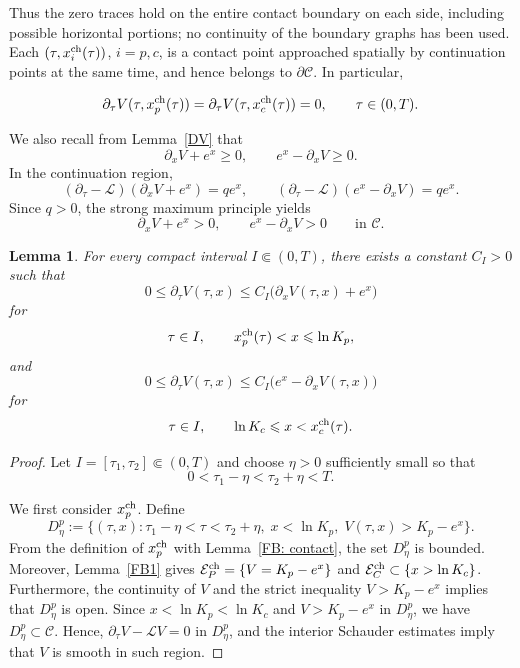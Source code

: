 \documentclass[11pt, a4paper, leqno]{amsart}
\numberwithin{equation}{section}
\theoremstyle{plain}
\newtheorem{lemma}[theorem]{Lemma}
\theoremstyle{definition}
\theoremstyle{remark}
\def\leq{\leqslant}
\def\geq{\geqslant}
\begin{document}
{Thus the zero traces hold on the entire contact boundary on each side,
including possible horizontal portions; no continuity of the boundary
graphs has been used. Each $(\tau,x_i^{\rm ch}(\tau))$, $i=p,c$,
is a contact point approached spatially by continuation points at the
same time, and hence belongs to $\partial\mathcal C$. In particular,

\begin{equation}\label{Vtau boundary}
    \partial_\tau V(\tau,x_p^{\rm ch}(\tau))
    =
    \partial_\tau V(\tau,x_c^{\rm ch}(\tau))
    =0,
    \qquad \tau\in(0,T).
\end{equation}

We also recall from Lemma~\ref{DV} that
\[
    \partial_xV+e^x\geq0,
    \qquad
    e^x-\partial_xV\geq0.
\]
In the continuation region,
\[
    (\partial_\tau-\mathcal L)(\partial_xV+e^x)
    =qe^x,
    \qquad
    (\partial_\tau-\mathcal L)(e^x-\partial_xV)
    =qe^x.
\]
Since $q>0$, the strong maximum principle yields
\begin{equation}\label{strict spatial derivative}
    \partial_xV+e^x>0,
    \qquad
    e^x-\partial_xV>0
    \qquad\text{in }\mathcal C.
\end{equation}

\begin{lemma}\label{derivative estimate FB}
For every compact interval $I\Subset(0,T)$, there exists a constant
$C_I>0$ such that
\begin{equation}\label{put derivative estimate}
    0\leq\partial_\tau V(\tau,x)
    \leq
    C_I\bigl(\partial_xV(\tau,x)+e^x\bigr)
\end{equation}
for
\[
    \tau\in I,
    \qquad
    x_p^{\rm ch}(\tau)<x\leq\ln K_p,
\]
and
\begin{equation}\label{call derivative estimate}
    0\leq\partial_\tau V(\tau,x)
    \leq
    C_I\bigl(e^x-\partial_xV(\tau,x)\bigr)
\end{equation}
for
\[
    \tau\in I,
    \qquad
    \ln K_c\leq x<x_c^{\rm ch}(\tau).
\]
\end{lemma}

\begin{proof}
Let $I=[\tau_1,\tau_2]\Subset(0,T)$ and choose $\eta>0$ sufficiently
small so that
\[
    0<\tau_1-\eta<\tau_2+\eta<T.
\]

We first consider $x_p^{\rm ch}$. Define
\[
    D_\eta^p
    :=
    \{(\tau,x):
    \tau_1-\eta<\tau<\tau_2+\eta,\;
    x<\ln K_p,\;
    V(\tau,x)>K_p-e^x\}.
\]
From the definition of $x_p^{\rm ch}$ with Lemma~\ref{FB: contact}, the set $D_\eta^p$ is bounded.
Moreover, Lemma~\ref{FB1} gives
$\mathcal E_P^{\rm ch}=\{V=K_p-e^x\}$ and
$\mathcal E_C^{\rm ch}\subset\{x>\ln K_c\}$.
Furthermore, the continuity of $V$ and the strict inequality $V>K_p-e^x$ implies that $D_\eta^p$ is open.
Since $x<\ln K_p<\ln K_c$ and $V>K_p-e^x$ in $D_\eta^p$,
we have $D_\eta^p\subset\mathcal C$. Hence,
$\partial_\tau V-\mathcal LV=0$ in $D_\eta^p$, and the interior
Schauder estimates imply that $V$ is smooth in such region.


\end{proof}}
\end{document}
